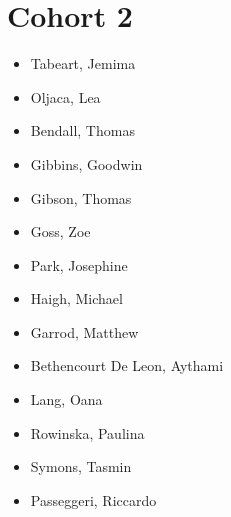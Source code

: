 \documentclass{article}
\begin{document}
\section*{Cohort 2}
\begin{itemize}
    \item Tabeart, Jemima \cite{tabeart2018conditioning, tabeart2020improving, tabeart2020impact,tabeart2022new} %
    \item Oljaca, Lea \cite{oljaca2018almost}
    \item Bendall, Thomas \cite{bendall2020compatible, bendall2019recovered, bendall2019statistical,bendall2021perspectives} %
    \item Gibbins, Goodwin \cite{gibbins2020entropy,gibbins2021comments} %
    \item Gibson, Thomas \cite{shipton2018higher, bendall2020compatible, gibson2020slate, gibson2019compatible, Gibson2019a, Gibson2019b, Gibson2019c, Gibson2019d} %
    \item Goss, Zoe \cite{goss2020identifying,coles2021tidal}
    \item Park, Josephine
    \item Haigh, Michael \cite{haigh2018potential, haigh2020rossby} %
    \item Garrod, Matthew \cite{garrod2018large,garrod2021influencing} %
    \item Bethencourt De Leon, Aythami \cite{de2020implications,alonso2020modelling,alonso2019burgers,alonso2020well}
    \item Lang, Oana \cite{lang2022well}
    \item Rowinska, Paulina \cite{everitt2020delayed,rowinska2021multi}
    \item Symons, Tasmin \cite{bingham2016brownian,bingham2019dimension,bingham2019gaussian} %
    \item Passeggeri, Riccardo \cite{passeggeri2020spectral, passeggeri2019mixing, passeggeri2019limit, passeggeri2020signature} %
\end{itemize}
\end{document}
